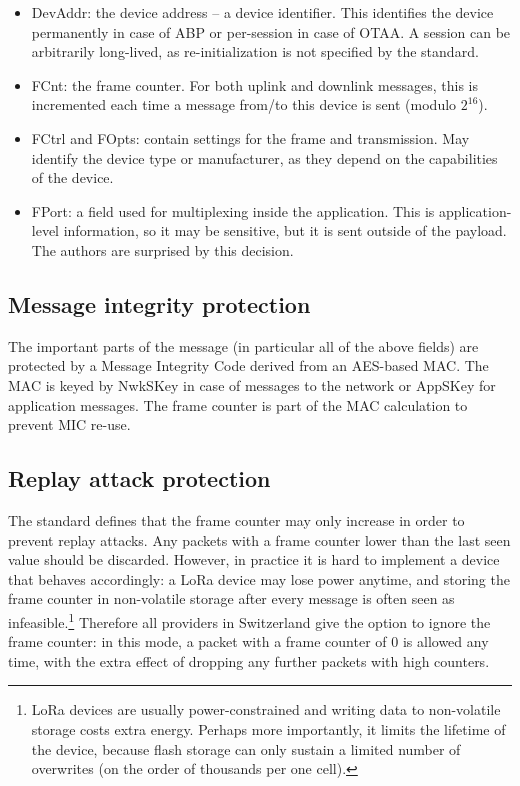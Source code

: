 \begin{itemize}
\tightlist
\item
  {DevAddr: the device address -- a device identifier. This identifies
  the device permanently in case of ABP or per-session in case of OTAA.
  A session can be arbitrarily long-lived, as re-initialization is not
  specified by the standard.}
\item
  {FCnt: the frame counter. For both uplink and downlink messages, this
  is incremented each time a message from/to this device is sent (modulo
  $2^{16}$).}
\item
  {FCtrl and FOpts: contain settings for the frame and transmission. May
  identify the device type or manufacturer, as they depend on the
  capabilities of the device.}
\item
  {FPort: a field used for multiplexing inside the application. This is
  application-level information, so it may be sensitive, but it is sent
  outside of the payload. The authors are surprised by this decision.}
\end{itemize}

\subsection{Message integrity protection}

{The important parts of the message (in particular all of the above
fields) are protected by a Message Integrity Code derived from an
AES-based MAC. The MAC is keyed by NwkSKey in case of messages to the
network or AppSKey for application messages. The frame counter is part
of the MAC calculation to prevent MIC re-use.}

\subsection{Replay attack protection}

{The standard defines that the frame counter may only increase in order
to prevent replay attacks. Any packets with a frame counter lower than
the last seen value should be discarded. However, in practice it is hard
to implement a device that behaves accordingly: a LoRa device may lose
power anytime, and storing the frame counter in non-volatile storage
after every message is often seen as
infeasible.\footnote{LoRa devices are usually power-constrained and writing data to non-volatile storage costs extra energy. Perhaps more importantly, it limits the lifetime of the device, because flash storage can only sustain a limited number of overwrites (on the order of thousands per one cell).} Therefore
all providers in Switzerland give the option to ignore the frame
counter: in this mode, a packet with a frame counter of 0 is allowed any
time, with the extra effect of dropping any further packets with high
counters.}

